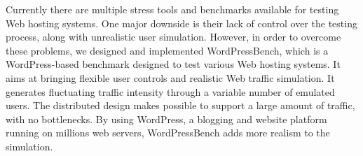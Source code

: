 
Currently there are multiple stress tools and benchmarks available for testing Web hosting systems. One major downside is their lack of control over the testing process, along with unrealistic user simulation. However, in order to overcome these problems, we designed and implemented WordPressBench, which is a WordPress-based benchmark designed to test various Web hosting systems. It aims at bringing flexible user controls and realistic Web traffic simulation. It generates fluctuating traffic intensity through a variable number of emulated users. The distributed design makes possible to support a large amount of traffic, with no bottlenecks. By using WordPress, a blogging and website platform running on millions web servers, WordPressBench adds more realism to the simulation.
